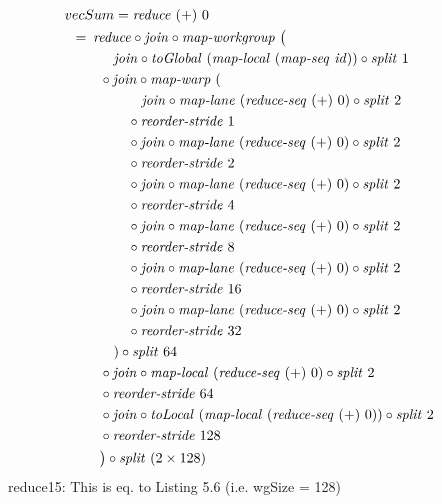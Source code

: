 \begin{align}
  &\hspace{-1.5em}vecSum = \reduce\ (+)\ 0\nonumber\\
  &\hspace{-2em}\quad\begin{aligned}
    &=\hspace{.2em}
      \reduce \circ \join \circ \mapWorkgroup\ \big(\\
      &\qquad\quad \join \circ \toGlobal\ (\mapLocal\ (\mapSeq\ \id)) \circ \splitN\ 1\\
      &\qquad \circ \join \circ \mapWarp\ (\\
      &\qquad\qquad\ \ \ \join \circ \mapLane\ (\reduceSeq\ (+)\ 0) \circ \splitN\ 2\\
      &\qquad\qquad \circ \reorderStride\ 1\\
      &\qquad\qquad \circ \join \circ \mapLane\ (\reduceSeq\ (+)\ 0) \circ \splitN\ 2\\
      &\qquad\qquad \circ \reorderStride\ 2\\
      &\qquad\qquad \circ \join \circ \mapLane\ (\reduceSeq\ (+)\ 0) \circ \splitN\ 2\\
      &\qquad\qquad \circ \reorderStride\ 4\\
      &\qquad\qquad \circ \join \circ \mapLane\ (\reduceSeq\ (+)\ 0) \circ \splitN\ 2\\
      &\qquad\qquad \circ \reorderStride\ 8\\
      &\qquad\qquad \circ \join \circ \mapLane\ (\reduceSeq\ (+)\ 0) \circ \splitN\ 2\\
      &\qquad\qquad \circ \reorderStride\ 16\\
      &\qquad\qquad \circ \join \circ \mapLane\ (\reduceSeq\ (+)\ 0) \circ \splitN\ 2\\
      &\qquad\qquad \circ \reorderStride\ 32\\
      &\qquad\quad) \circ \splitN\ 64\\
      &\qquad \circ \join \circ \mapLocal\ (\reduceSeq\ (+)\ 0) \circ \splitN\ 2\\
      &\qquad \circ \reorderStride\ 64\\
      &\qquad \circ \join \circ \toLocal\ (\mapLocal\ (\reduceSeq\ (+)\ 0)) \circ \splitN\ 2\\
      &\qquad \circ \reorderStride\ 128\\
      &\qquad\big) \circ \splitN\ (2\times 128)
  \end{aligned}
\end{align}
reduce15: This is eq. to Listing 5.6 (i.e. wgSize = 128)


